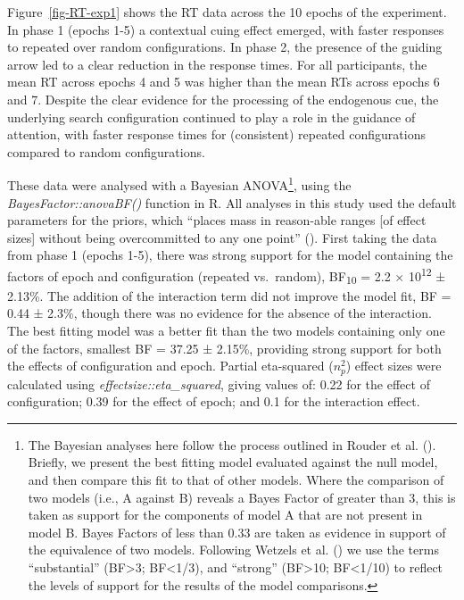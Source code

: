 \documentclass[
  man,
  floatsintext,
  longtable,
  nolmodern,
  notxfonts,
  notimes,
  colorlinks=true,linkcolor=blue,citecolor=blue,urlcolor=blue]{apa7}
\begin{document}
Figure~\ref{fig-RT-exp1} shows the RT data across the 10 epochs of the
experiment. In phase 1 (epochs 1-5) a contextual cuing effect emerged,
with faster responses to repeated over random configurations. In phase
2, the presence of the guiding arrow led to a clear reduction in the
response times. For all participants, the mean RT across epochs 4 and 5
was higher than the mean RTs across epochs 6 and 7. Despite the clear
evidence for the processing of the endogenous cue, the underlying search
configuration continued to play a role in the guidance of attention,
with faster response times for (consistent) repeated configurations
compared to random configurations.

These data were analysed with a Bayesian ANOVA\footnote{The Bayesian
  analyses here follow the process outlined in Rouder et al.
  (). Briefly, we present the best
  fitting model evaluated against the null model, and then compare this
  fit to that of other models. Where the comparison of two models (i.e.,
  A against B) reveals a Bayes Factor of greater than 3, this is taken
  as support for the components of model A that are not present in model
  B. Bayes Factors of less than 0.33 are taken as evidence in support of
  the equivalence of two models. Following Wetzels et al.
  () we use the terms ``substantial''
  (BF\textgreater3; BF\textless1/3), and ``strong'' (BF\textgreater10;
  BF\textless1/10) to reflect the levels of support for the results of
  the model comparisons.}, using the \emph{BayesFactor::anovaBF()}
function in R. All analyses in this study used the default parameters
for the priors, which ``places mass in reason-able ranges {[}of effect
sizes{]} without being overcommitted to any one point''
(). First taking
the data from phase 1 (epochs 1-5), there was strong support for the
model containing the factors of epoch and configuration (repeated
vs.~random), BF\textsubscript{10} = 2.2 × 10\textsuperscript{12} ±
2.13\%. The addition of the interaction term did not improve the model
fit, BF = 0.44 ± 2.3\%, though there was no evidence for the absence of
the interaction. The best fitting model was a better fit than the two
models containing only one of the factors, smallest BF = 37.25 ± 2.15\%,
providing strong support for both the effects of configuration and
epoch. Partial eta-squared (\(n^2_p\)) effect sizes were calculated
using \emph{effectsize::eta\_squared}, giving values of: 0.22 for the
effect of configuration; 0.39 for the effect of epoch; and 0.1 for the
interaction effect.
\end{document}
